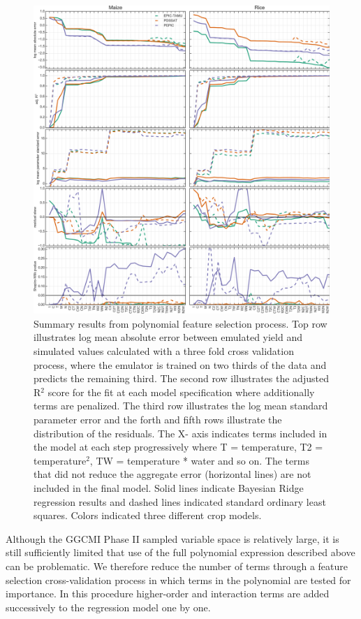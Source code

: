 \documentclass[gmd, manuscript]{copernicus} %
\begin{document}
\begin{figure}[ht]
\centering
   \includegraphics[width=14cm]{figures/model_select_maize_rice.png}
   \caption{Summary results from polynomial feature selection process.
   Top row illustrates log mean absolute error between emulated yield and simulated values calculated with a three fold cross validation process, where the emulator is trained on two thirds of the data and predicts the remaining third.
   The second row illustrates the adjusted R$^2$ score for the fit at each model specification where additionally terms are penalized.
   The third row illustrates the log mean standard parameter error and the forth and fifth rows illustrate the distribution of the residuals.
   The X- axis indicates terms included in the model at each step progressively where T = temperature, T2 = temperature$^{2}$, TW  = temperature * water and so on. 
   The terms that did not reduce the aggregate error (horizontal lines) are not included in the final model. 
   Solid lines indicate Bayesian Ridge regression results and dashed lines indicated standard ordinary least squares. 
   Colors indicated three different crop models.}
   \label{fig:features}
\end{figure}

Although the GGCMI Phase II sampled variable space is relatively large, it is still sufficiently limited that use of the full polynomial expression described above can be problematic. 
We therefore reduce the number of terms through a feature selection cross-validation process in which terms in the polynomial are tested for importance. 
In this procedure higher-order and interaction terms are added successively to the regression model one by one. 
\end{document}
